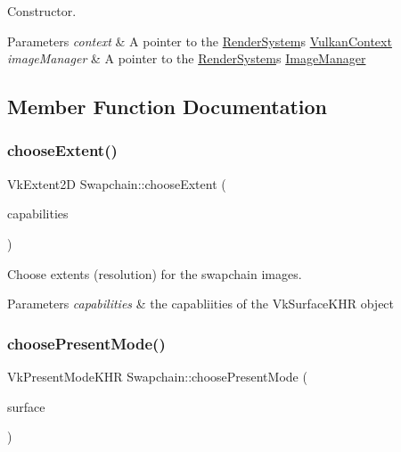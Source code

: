 Constructor. 


\begin{DoxyParams}{Parameters}
{\em context} & A pointer to the \mbox{\hyperlink{class_render_system}{Render\+System}}\textquotesingle{}s \mbox{\hyperlink{class_vulkan_context}{Vulkan\+Context}} \\
\hline
{\em image\+Manager} & A pointer to the \mbox{\hyperlink{class_render_system}{Render\+System}}\textquotesingle{}s \mbox{\hyperlink{class_image_manager}{Image\+Manager}} \\
\hline
\end{DoxyParams}


\subsection{Member Function Documentation}
\mbox{\label{class_swapchain_ac336660395258258bbc2f13c18b261f8}} 
\subsubsection{\texorpdfstring{chooseExtent()}{chooseExtent()}}
{\footnotesize\ttfamily Vk\+Extent2D Swapchain\+::choose\+Extent (\begin{DoxyParamCaption}\item[{const Vk\+Surface\+Capabilities\+K\+HR \&}]{capabilities }\end{DoxyParamCaption})\hspace{0.3cm}{\ttfamily [private]}}



Choose extents (resolution) for the swapchain images. 


\begin{DoxyParams}{Parameters}
{\em capabilities} & the capabliities of the Vk\+Surface\+K\+HR object \\
\hline
\end{DoxyParams}
\mbox{\label{class_swapchain_a871b68d6d79fe8ead853252e0c1f2954}} 
\subsubsection{\texorpdfstring{choosePresentMode()}{choosePresentMode()}}
{\footnotesize\ttfamily Vk\+Present\+Mode\+K\+HR Swapchain\+::choose\+Present\+Mode (\begin{DoxyParamCaption}\item[{Vk\+Surface\+K\+HR}]{surface }\end{DoxyParamCaption})\hspace{0.3cm}{\ttfamily [private]}}



